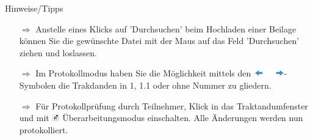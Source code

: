 \documentclass{article}
\begin{document}
\begin{beamerlikethm}{Hinweise/Tipps}
\begin{itemize}
  \item[$\Longrightarrow$] Anstelle eines Klicks auf 'Durchsuchen' beim Hochladen einer Beilage  können Sie die gewünschte Datei mit der Maus auf das Feld 'Durchsuchen' ziehen und loslassen.
  \item[$\Longrightarrow$] Im Protokollmodus haben Sie die Möglichkeit mittels den \includegraphics[height=9pt]{Icons/Pfeil-links-rechts.jpg}-Symbolen die Trakdanden in 1, 1.1 oder ohne Nummer zu gliedern.
	\item[$\Longrightarrow$] Für  Protokollprüfung durch Teilnehmer, Klick in das Traktandumfenster und mit \includegraphics[height=9pt]{Icons/UeberarbModus.jpg} Überarbeitungsmodus einschalten. Alle Änderungen werden nun protokolliert.
\end{itemize}
\end{beamerlikethm}

	
	


\pagebreak


\vspace{\baselineskip}

\end{document}
